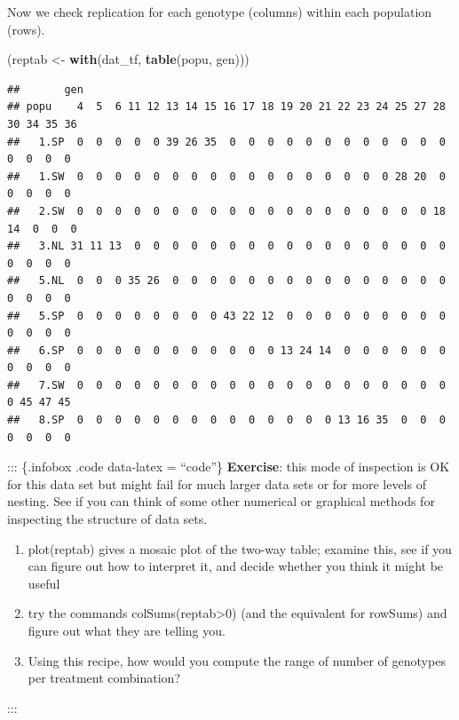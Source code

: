 \documentclass[
  12pt,
]{book}
\newenvironment{Shaded}{\begin{snugshade}}{\end{snugshade}}
\newcommand{\KeywordTok}[1]{\textcolor[rgb]{0.13,0.29,0.53}{\textbf{#1}}}
\newcommand{\NormalTok}[1]{#1}
\newcommand{\StringTok}[1]{\textcolor[rgb]{0.31,0.60,0.02}{#1}}
\providecommand{\tightlist}{%
  \setlength{\itemsep}{0pt}\setlength{\parskip}{0pt}}
\begin{document}
Now we check replication for each genotype (columns) within each population (rows).

\begin{Shaded}
\begin{Highlighting}[]
\NormalTok{(reptab \textless{}{-}}\StringTok{ }\KeywordTok{with}\NormalTok{(dat\_tf, }\KeywordTok{table}\NormalTok{(popu, gen)))}
\end{Highlighting}
\end{Shaded}

\begin{verbatim}
##       gen
## popu    4  5  6 11 12 13 14 15 16 17 18 19 20 21 22 23 24 25 27 28 30 34 35 36
##   1.SP  0  0  0  0  0 39 26 35  0  0  0  0  0  0  0  0  0  0  0  0  0  0  0  0
##   1.SW  0  0  0  0  0  0  0  0  0  0  0  0  0  0  0  0  0 28 20  0  0  0  0  0
##   2.SW  0  0  0  0  0  0  0  0  0  0  0  0  0  0  0  0  0  0  0 18 14  0  0  0
##   3.NL 31 11 13  0  0  0  0  0  0  0  0  0  0  0  0  0  0  0  0  0  0  0  0  0
##   5.NL  0  0  0 35 26  0  0  0  0  0  0  0  0  0  0  0  0  0  0  0  0  0  0  0
##   5.SP  0  0  0  0  0  0  0  0 43 22 12  0  0  0  0  0  0  0  0  0  0  0  0  0
##   6.SP  0  0  0  0  0  0  0  0  0  0  0 13 24 14  0  0  0  0  0  0  0  0  0  0
##   7.SW  0  0  0  0  0  0  0  0  0  0  0  0  0  0  0  0  0  0  0  0  0 45 47 45
##   8.SP  0  0  0  0  0  0  0  0  0  0  0  0  0  0 13 16 35  0  0  0  0  0  0  0
\end{verbatim}

::: \{.infobox .code data-latex = ``code''\}
\textbf{Exercise}: this mode of inspection is OK for this data set but might fail for much larger data sets or for more levels of nesting. See if you can think of some other numerical or graphical methods for inspecting the structure of data sets.

\begin{enumerate}
\def\labelenumi{\arabic{enumi}.}
\tightlist
\item
  plot(reptab) gives a mosaic plot of the two-way table; examine this, see if you can figure out how to interpret it, and decide whether you think it might be useful
\item
  try the commands colSums(reptab\textgreater0) (and the equivalent for rowSums) and figure out what they are telling you.
\item
  Using this recipe, how would you compute the range of number of genotypes per treatment combination?
\end{enumerate}

:::
\end{document}
